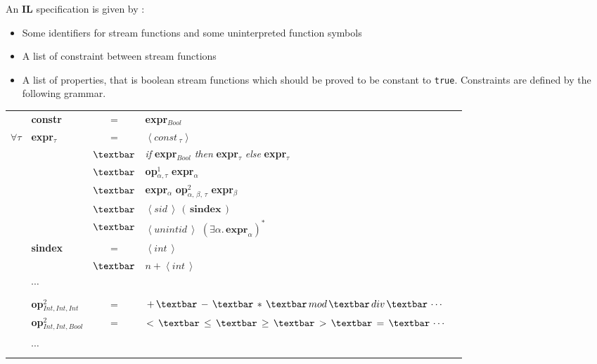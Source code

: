An \textbf{IL} specification is given by :
\begin{itemize}
\item Some identifiers for stream functions and some uninterpreted function symbols
\item A list of constraint between stream functions
\item A list of properties, that is boolean stream functions which should be proved to be constant to \texttt{true}.
Constraints are defined by the following grammar.
\end{itemize}

\bigskip

\begin{tabular}{llclr}
& \textbf{constr} & = & \textbf{expr}$_{Bool}$ & \\
$\forall \tau$ & \textbf{expr}$_{\tau}$ & = & $\left< \textit{const}\,_\tau  \right>$ &\\
& & $\textbar$ & \textit{if} \textbf{expr}$_{Bool}$ \textit{then} \textbf{expr}$_{\tau}$ \textit{else} \textbf{expr}$_{\tau}$ \\

& & $\textbar$ &\textbf{op}$^1_{\alpha, \tau}$ \textbf{expr}$_{\alpha}$ \\
& & $\textbar$ & \textbf{expr}$_{\alpha}$ \textbf{op}$^2_{\alpha, \, \beta, \, \tau}$ \textbf{expr}$_{\beta}$ \\
& & $\textbar$ & $\left< \textit{sid} \,  \right> \, \left(\,\textbf{sindex}\,\right)$ \\
& & $\textbar$ & $\left< \textit{unintid} \,  \right> $ $\left(  \exists \alpha . \, \textbf{expr}_\alpha \right)^{*}$
\\
& \textbf{sindex} & = & $\left< \textit{int} \,  \right> $ & \\
& & $\textbar$ & $ \textit{n} +  \left< \textit{int} \,  \right> $ & \\


& $\cdots$ & & \\
&&& \\

& \textbf{op}$^2_{Int, Int, Int}$ & = & $+ \,\textbar \, - \,\textbar\, *  \,\textbar\, mod  \,\textbar\, div  \,\textbar\, \cdots $ & \\
& \textbf{op}$^2_{Int, Int, Bool}$ & = & $< \,\textbar \, \leq \,\textbar\, \geq \,\textbar\, >  \,\textbar\, =  \,\textbar\, \cdots $ & \\
&&& \\
& $\cdots$ & & \\
&&& \\
\end{tabular}

